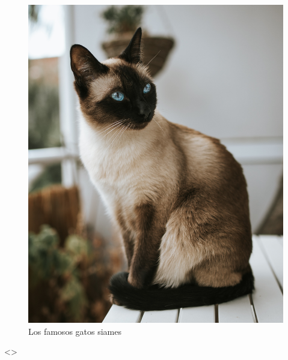 \documentclass[
  12pt,
  letterpaper,
  DIV=11,
  numbers=noendperiod,
  oneside]{scrreport}
\begin{document}
\begin{figure}
\begin{minipage}[t]{0.50\linewidth}
{{\includegraphics{./imagenes/gato_siames.jpg}

}

}

\end{minipage}%

\caption{\label{fig-elephants}Los famosos gatos siames}

\end{figure}

\textless{}\break\textgreater{}
\end{document}
